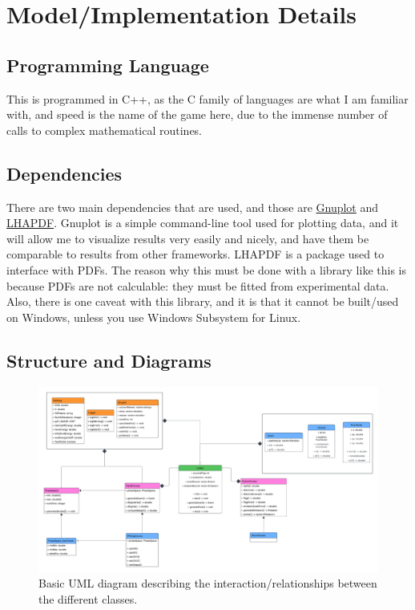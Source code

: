 \section{Model/Implementation Details}\label{sec:3-model}

\subsection{Programming Language}

This is programmed in C++, as the C family of languages are what I am familiar with, and speed is the name of the game here, due to the immense number of calls to complex mathematical routines.

\subsection{Dependencies}

There are two main dependencies that are used, and those are \href{http://gnuplot.info/}{Gnuplot} and \href{https://www.lhapdf.org/}{LHAPDF}. Gnuplot is a simple command-line tool used for plotting data, and it will allow me to visualize results very easily and nicely, and have them be comparable to results from other frameworks. \textsc{LHAPDF} is a package used to interface with PDFs. The reason why this must be done with a library like this is because PDFs are not calculable: they must be fitted from experimental data. Also, there is one caveat with this library, and it is that it cannot be built/used on Windows, unless you use Windows Subsystem for Linux.


\subsection{Structure and Diagrams}

\begin{figure}[ht]
  \centering
  \includegraphics[width=0.9\linewidth]{./res/gfx/ColSim_Updated2.pdf}
  \caption{Basic UML diagram describing the interaction/relationships between the different classes.}
  \label{fig:3-model-uml}
\end{figure}


